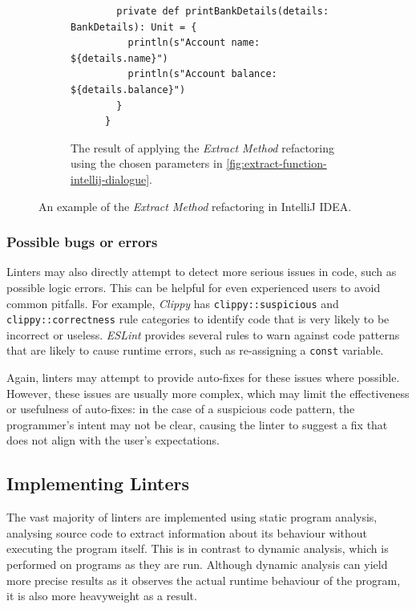 \begin{figure}[htbp]
\begin{subfigure}{\textwidth}
\begin{verbatim}
        private def printBankDetails(details: BankDetails): Unit = {
          println(s"Account name: ${details.name}")
          println(s"Account balance: ${details.balance}")
        }
      }
    \end{verbatim}
    \caption{The result of applying the \emph{Extract Method} refactoring using the chosen parameters in \cref{fig:extract-function-intellij-dialogue}.}
  \end{subfigure}
  \caption{An example of the \emph{Extract Method} refactoring in IntelliJ IDEA.}
  \label{fig:extract-function-intellij}
\end{figure}

\subsubsection{Possible bugs or errors}

Linters may also directly attempt to detect more serious issues in code, such as possible logic errors.
This can be helpful for even experienced users to avoid common pitfalls.
For example, \emph{Clippy} has \texttt{clippy::suspicious} and \texttt{clippy::correctness} rule categories to identify code that is very likely to be incorrect or useless.
\emph{ESLint} provides several rules to warn against code patterns that are likely to cause runtime errors, such as re-assigning a \texttt{const} variable.

Again, linters may attempt to provide auto-fixes for these issues where possible.
However, these issues are usually more complex, which may limit the effectiveness or usefulness of auto-fixes: in the case of a suspicious code pattern, the programmer's intent may not be clear, causing the linter to suggest a fix that does not align with the user's expectations.

\subsection{Implementing Linters}


The vast majority of linters are implemented using static program analysis, analysing source code to extract information about its behaviour without executing the program itself. 
This is in contrast to dynamic analysis, which is performed on programs as they are run.
Although dynamic analysis can yield more precise results as it observes the actual runtime behaviour of the program, it is also more heavyweight as a result.


